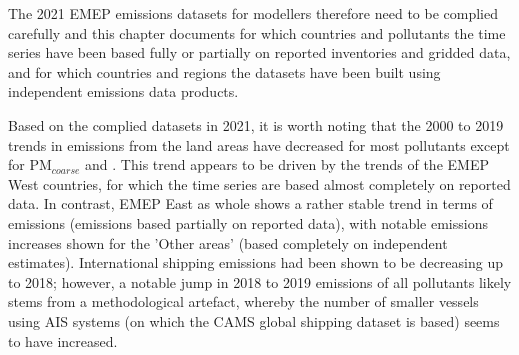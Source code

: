 The 2021 EMEP emissions datasets for modellers therefore need to be complied carefully and this chapter documents for which countries and pollutants the time series have been based fully or partially on reported inventories and gridded data, and for which countries and regions the datasets have been built using independent emissions data products.

Based on the complied datasets in 2021, it is worth noting that the 2000 to 2019 trends in emissions from the land areas have decreased for most pollutants except for PM$_{coarse}$  and \nhiii. This trend appears to be driven by the trends of the EMEP West countries, for which the time series are based almost completely on reported data. In contrast, EMEP East as whole shows a rather stable trend in terms of emissions (emissions based partially on reported data), with notable emissions increases shown for the 'Other areas' (based completely on independent estimates). International shipping emissions had been shown to be decreasing up to 2018; however, a notable jump in 2018  to 2019 emissions of all pollutants likely stems from a methodological artefact, whereby the number of smaller vessels using AIS systems (on which the CAMS global shipping dataset is based) seems to have increased.

\clearpage
\renewcommand\bibname{References}      %
%

